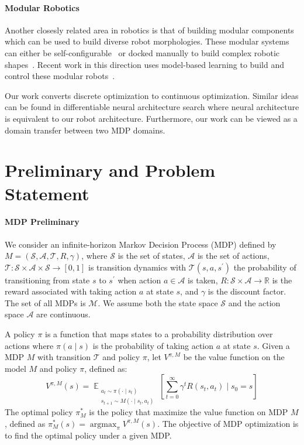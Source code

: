 \documentclass[nohyperref]{article}
\theoremstyle{plain}
\theoremstyle{definition}
\theoremstyle{remark}
\begin{document}
\paragraph{Modular Robotics}
Another closesly related area in robotics is that of building modular components which can be used to build diverse robot morphologies. These modular systems can either be self-configurable~\cite{stoy2010self, murata2007self} or docked manually to build complex robotic shapes~\cite{yim2000polybot,wright2007design,romanishin2013m,gilpin2008miche,daudelin2018integrated}. Recent work in this direction uses model-based learning to build and control these modular robots~\cite{whitman2021learning,whitman2020modular}.

Our work converts discrete optimization to continuous optimization. Similar ideas can be found in differentiable neural architecture search \cite{zoph2016neural,darts} where neural architecture is equivalent to our robot architecture. Furthermore, our work can be viewed as a domain transfer between two MDP domains.




\section{Preliminary and Problem Statement}

\paragraph{MDP Preliminary}
We consider  an infinite-horizon Markov Decision Process (MDP) defined by $M = (\mathcal{S}, \mathcal{A}, \mathcal{T}, R, \gamma)$, where  $\mathcal{S}$ is the set of states, $\mathcal{A}$ is the set of actions, $\mathcal{T}: \mathcal{S} \times \mathcal{A} \times \mathcal{S} \rightarrow [0, 1] $ is transition dynamics with $\mathcal{T}(s, a, s^\prime)$ the probability of transitioning from state $s$ to $s^\prime$ when action $a \in \mathcal{A}$ is taken, $R: \mathcal{S} \times \mathcal{A} \rightarrow \mathbb{R}$ is the reward associated with taking action $a$ at state $s$, and $\gamma$ is the discount factor.
The set of all MDPs is $\mathcal{M}$.
We assume both the state space $\mathcal{S}$ and the action space $\mathcal{A}$ are continuous.

A policy $\pi$ is a function that maps states to a probability distribution over
actions where $\pi(a \mid s)$ is the probability of taking action $a$ at state $s$.
Given a MDP $M$ with transition $\mathcal{T}$ and policy $\pi$, let $V^{\pi, M}$ be the value function on the model $M$ and policy $\pi$, defined as:
\begin{equation}
    V^{\pi, M} (s) = \mathop{\mathbb{E}}_{ 
    \substack{a_t \sim \pi(\cdot \mid s_t)\\ s_{t+1} \sim M(\cdot \mid s_t, a_t)}}
    [\sum_{t=0}^\infty \gamma^t R(s_t, a_t) \mid s_0 = s]
\end{equation}
The optimal policy $\pi_{M}^*$ is the policy that maximize the value function on MDP $M$, defined as $\pi_{M}^*(s) = \mathop{\arg \max}_{\pi} V^{\pi, M} (s)$.
The objective of MDP optimization is to find the optimal policy under a given MDP.
\end{document}

